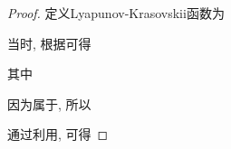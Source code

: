         \begin{proof}
        定义Lyapunov-Krasovskii函数为
        \begin{comment}
        V(t)=\frac{1}{2}\pi_{r_t}e^\top(t)[I_N\otimes Q]e(t).
        \end{comment}
        当时, 根据可得
        \begin{comment}\label{dVt}
        dV(t)&=\mathcal{L}V(t)dt+\rho(t)\pi_ue^\top(t)(I_N\otimes Q)\Sigma(t)dw(t),
        \end{comment}
        其中
        \begin{comment}\label{LV}
        \nonumber\mathcal{L}V(t)&=\pi_ue^\top(t)[I_N\otimes Q]\Big\{\tilde{f}(e(t))-\rho(t)\left[L(u)\otimes\Gamma\right](e(t)+\delta(t))\\
        \nonumber &\quad-\epsilon\rho(t)[D(u)\otimes\Gamma](\delta(t)+e(t)+\hat{s}(t))\Big\}\\
        \nonumber &\quad+\frac{1}{2}\pi_u\rho^2(t)\text{tr}[(I_N\otimes Q)\Sigma(t)\Sigma^\top(t)]+\frac{1}{2}\sum_{v=1}^{m}q_{uv}\pi_ve^\top(t)[I_N\otimes Q]e(t)\\
        \nonumber&\leq\pi_ue^\top(t)[I_N\otimes Q]\tilde{f}(e(t))-\pi_u\rho(t)\underline{\gamma}e^\top(t)[L(u)\otimes Q]e(t)\\
        \nonumber&\quad-\pi_u\rho(t)e^\top(t)[L(u)\otimes Q\Gamma]\delta(t)-\pi_u\epsilon\rho(t)e^\top(t)[D(u)\otimes Q\Gamma]\delta(t)\\
        \nonumber &\quad-\pi_u\epsilon\rho(t)\underline{\gamma}e^\top(t)[D(u)\otimes Q]e(t)-\pi_u\epsilon\rho(t)e^\top(t)[D(u)\otimes Q\Gamma]\hat{s}(t)\\
        &\quad+\frac{1}{2}\pi_u\rho^2(t)\text{tr}[(I_N\otimes Q)\Sigma(t)\Sigma^\top(t)]+\frac{1}{2}\sum_{v=1}^{m}q_{uv}\pi_ve^\top(t)[I_N\otimes Q]e(t).
        \end{comment}
        因为属于, 所以
        \begin{comment}
        \nonumber e^\top(t)[I_N\otimes Q]\tilde{f}(e(t))&\leq-\xi e^\top(t)[I_N\otimes Q]e(t)+e^\top(t)[I_N\otimes Q\Delta]e(t)\\
        &\leq(\bar{\delta}-\xi)e^\top(t)[I_N\otimes Q]e(t).
        \end{comment}
        通过利用, 可得
        \begin{comment}
        \nonumber-e^\top(t)[L(u)\otimes Q\Gamma]\delta(t)&\leq\frac{\mu}{2}e^\top(t)[L(u)L(u)^\top\otimes Q^2\Gamma^2]e(t)+\frac{1}{2\mu}\delta^\top(t)\delta(t)\\
        &\leq\frac{\mu}{2}\bar{\lambda}^2\bar{q}^2\bar{\gamma}^2 e^\top(t)e(t)+\frac{1}{2\mu}\delta^\top(t)\delta(t).

\end{comment}
\end{proof}
